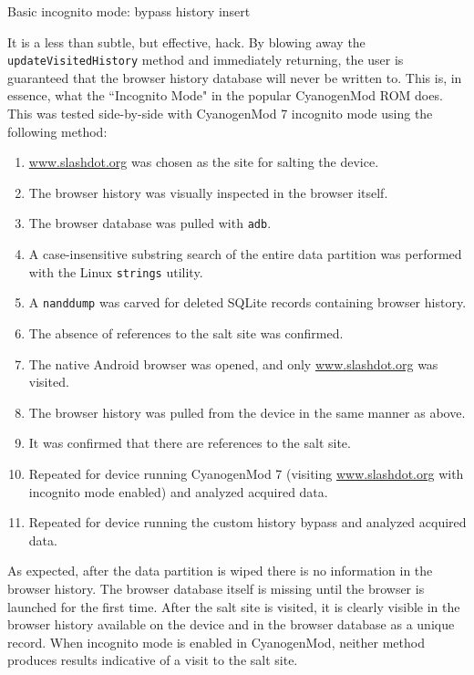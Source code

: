 \begin{table}[htb]

\caption{Basic incognito mode: bypass history insert}
\label{tab:incognito}
\end{table}

It is a less than subtle, but effective, hack.  By blowing away the \texttt{updateVisitedHistory} method and immediately returning,
the user is guaranteed that the browser history database will never be written to.  This is, in essence, what the ``Incognito Mode"
in the popular CyanogenMod ROM does. This was tested side-by-side with CyanogenMod 7 incognito mode using the following method:

\begin{enumerate}
\item \url{www.slashdot.org} was chosen as the site for salting the device.
\item The browser history was visually inspected in the browser itself.
\item The browser database was pulled with \texttt{adb}.
\item A case-insensitive substring search of the entire data partition was performed with the Linux \texttt{strings} utility.
\item A \texttt{nanddump} was carved for deleted SQLite records containing browser history.
\item The absence of references to the salt site was confirmed.
\item The native Android browser was opened, and only \url{www.slashdot.org} was visited.
\item The browser history was pulled from the device in the same manner as above.
\item It was confirmed that there are references to the salt site.
\item Repeated for device running CyanogenMod 7 (visiting \url{www.slashdot.org} with incognito mode enabled) and analyzed acquired data.
\item Repeated for device running the custom history bypass and analyzed acquired data.
\end{enumerate}

As expected, after the data partition is wiped there is no information in the browser history.  The browser database itself is
missing until the browser is launched for the first time.  After the salt site is visited, it is clearly visible in the browser
history available on the device and in the browser database as a unique record.  When incognito mode is enabled in CyanogenMod,
neither method produces results indicative of a visit to the salt site.


